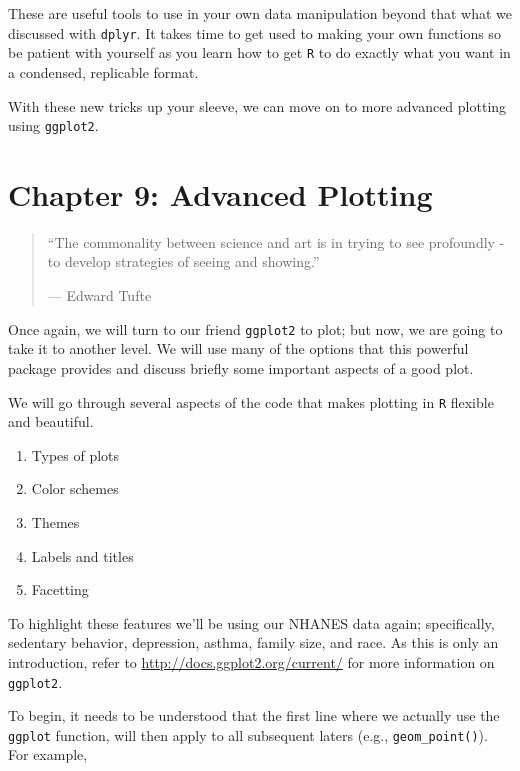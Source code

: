 \documentclass[]{tufte-book}
\providecommand{\tightlist}{%
  \setlength{\itemsep}{0pt}\setlength{\parskip}{0pt}}
\theoremstyle{definition}
\theoremstyle{definition}
\theoremstyle{remark}
\begin{document}
These are useful tools to use in your own data manipulation beyond that
what we discussed with \texttt{dplyr}. It takes time to get used to
making your own functions so be patient with yourself as you learn how
to get \texttt{R} to do exactly what you want in a condensed, replicable
format.

With these new tricks up your sleeve, we can move on to more advanced
plotting using \texttt{ggplot2}.

\chapter*{Chapter 9: Advanced
Plotting}\label{chapter-9-advanced-plotting}

\begin{quote}
``The commonality between science and art is in trying to see profoundly
- to develop strategies of seeing and showing.''

--- Edward Tufte
\end{quote}

Once again, we will turn to our friend \texttt{ggplot2} to plot; but
now, we are going to take it to another level. We will use many of the
options that this powerful package provides and discuss briefly some
important aspects of a good plot.

We will go through several aspects of the code that makes plotting in
\texttt{R} flexible and beautiful.

\begin{enumerate}
\def\labelenumi{\arabic{enumi}.}
\tightlist
\item
  Types of plots
\item
  Color schemes
\item
  Themes
\item
  Labels and titles
\item
  Facetting
\end{enumerate}

To highlight these features we'll be using our NHANES data again;
specifically, sedentary behavior, depression, asthma, family size, and
race. As this is only an introduction, refer to
\url{http://docs.ggplot2.org/current/} for more information on
\texttt{ggplot2}.

To begin, it needs to be understood that the first line where we
actually use the \texttt{ggplot} function, will then apply to all
subsequent laters (e.g., \texttt{geom\_point()}). For example,
\end{document}
